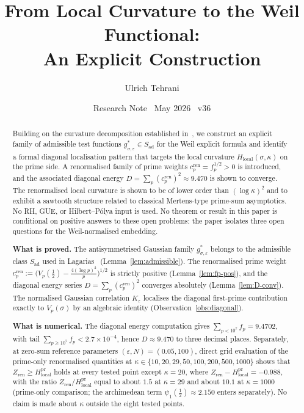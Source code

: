 \documentclass[11pt]{article}
\title{\vspace{-1.5em}\bfseries
From Local Curvature to the Weil Functional:\\[0.4em]
\large An Explicit Construction}
\author{Ulrich Tehrani}
\date{Research Note \textperiodcentered\ May 2026
      \textperiodcentered\ v36}
\newcommand{\Hlocal}{H_{\mathrm{local}}}
\newcommand{\Sad}{S_{\mathrm{ad}}}
\newcommand{\cren}{c_p^{\mathrm{ren}}}
\newcommand{\Zren}{Z_{\mathrm{ren}}}
\begin{document}
\maketitle

\begin{abstract}
Building on the curvature decomposition established
in~\cite{Paper1}, we construct an explicit family of admissible
test functions $g^*_{\sigma,\varepsilon}\in\Sad$ for the Weil
explicit formula and identify a formal diagonal localisation
pattern that targets the local curvature
$\Hlocal(\sigma,\kappa)$ on the prime side.
A renormalised family of prime weights
$\cren=f_p^{1/2}>0$ is introduced, and the associated diagonal
energy $D=\sum_p (\cren)^2\approx 9.470$ is shown to converge.
The renormalised local curvature is shown to be of lower order
than $(\log\kappa)^2$ and to exhibit a sawtooth structure related
to classical Mertens-type prime-sum asymptotics.
No RH, GUE, or Hilbert--P\'olya input is used.
No theorem or result in this paper is conditional on
positive answers to these open problems: the paper isolates three open
questions for the Weil-normalised embedding.

\textbf{What is proved.}
The antisymmetrised Gaussian family $g^*_{\sigma,\varepsilon}$
belongs to the admissible class $\Sad$ used in
Lagarias~\cite{Lagarias} (Lemma~\ref{lem:admissible}).
The renormalised prime weight
$\cren := \bigl(V_p(\tfrac12)-\tfrac{4(\log p)^2}{p}\bigr)^{1/2}$
is strictly positive (Lemma~\ref{lem:fp-pos}), and the diagonal
energy series $D=\sum_p (\cren)^2$ converges absolutely
(Lemma~\ref{lem:D-conv}).
The normalised Gaussian correlation $K_\varepsilon$
localises the diagonal first-prime contribution exactly
to $V_p(\sigma)$ by an algebraic identity
(Observation~\ref{obs:diagonal}).

\textbf{What is numerical.}
The diagonal energy computation gives
$\sum_{p<10^7} f_p = 9.4702$, with tail
$\sum_{p\ge 10^7}f_p < 2.7\times 10^{-4}$, hence
$D\approx 9.470$ to three decimal places.
Separately, at zero-sum reference parameters
$(\varepsilon,N)=(0.05,100)$, direct grid evaluation of the
prime-only renormalised quantities at
$\kappa\in\{10,20,29,50,100,200,500,1000\}$ shows that
$\Zren\ge\Hlocal^{\mathrm{pr}}$ holds at every tested point
except $\kappa=20$,
where $\Zren-\Hlocal^{\mathrm{pr}}=-0.988$, with the ratio
$\Zren/\Hlocal^{\mathrm{pr}}$
equal to about $1.5$ at $\kappa=29$ and about $10.1$ at $\kappa=1000$
(prime-only comparison; the archimedean term
$\psi_1(\tfrac12)\approx 2.150$ enters separately).
No claim is made about $\kappa$ outside the eight tested points.


\end{abstract}
\end{document}

